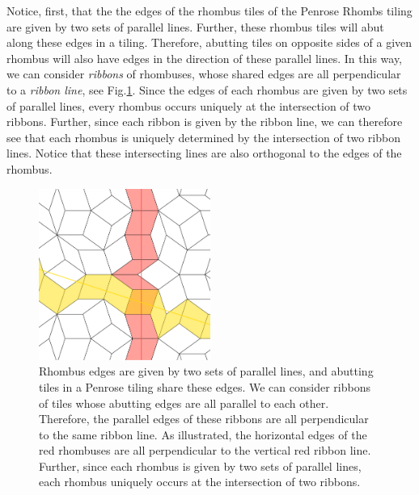 \documentclass[
  oneside,
  11pt, a4paper,
  footinclude=true,
  headinclude=true,
  cleardoublepage=empty
]{scrbook}
\begin{document}
Notice, first, that the the edges of the rhombus tiles of the Penrose Rhombs tiling are given by two sets of parallel lines. Further, these rhombus tiles will abut along these edges in a tiling. Therefore, abutting tiles on opposite sides of a given rhombus will also have edges in the direction of these parallel lines. In this way, we can consider \textit{ribbons} of rhombuses, whose shared edges are all perpendicular to a \textit{ribbon line}, see Fig.\ref{fig:rhombribbons}. Since the edges of each rhombus are given by two sets of parallel lines, every rhombus occurs uniquely at the intersection of two ribbons. Further, since each ribbon is given by the ribbon line, we can therefore see that each rhombus is uniquely determined by the intersection of two ribbon lines. Notice that these intersecting lines are also orthogonal to the edges of the rhombus. 

\begin{figure}[H]
\centering
\includegraphics[width=0.5\textwidth]{RhombRibbons}
\caption[Ribbons of Rhombs]{Rhombus edges are given by two sets of parallel lines, and abutting tiles in a Penrose tiling share these edges. We can consider ribbons of tiles whose abutting edges are all parallel to each other. Therefore, the parallel edges of these ribbons are all perpendicular to the same ribbon line. As illustrated, the horizontal edges of the red rhombuses are all perpendicular to the vertical red ribbon line. Further, since each rhombus is given by two sets of parallel lines, each rhombus uniquely occurs at the intersection of two ribbons.}
\label{fig:rhombribbons}
\end{figure}
\end{document}

